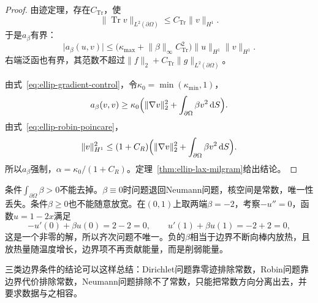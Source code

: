 \begin{proof}
由迹定理，存在$C_{\mathrm{Tr}}$，使
\[
 \lVert\operatorname{Tr}v\rVert_{L^2(\partial\Omega)}\leq C_{\mathrm{Tr}}\lVert v\rVert_{H^1} .
\]
于是$a_\beta$有界：
\[
 \lvert a_\beta(u,v)\rvert\leq\bigl(\kappa_{\max}+\lVert\beta\rVert_\infty C_{\mathrm{Tr}}^2\bigr)\lVert u\rVert_{H^1}\lVert v\rVert_{H^1} .
\]
右端泛函也有界，其范数不超过$\lVert f\rVert_2+C_{\mathrm{Tr}}\lVert g\rVert_{L^2(\partial\Omega)}$。

由式~\eqref{eq:ellip-gradient-control}，令$\kappa_0=\min(\kappa_{\min},1)$，
\[
 a_\beta(v,v)\geq\kappa_0\Bigl(\lVert\nabla v\rVert_2^2+\int_{\partial\Omega}\beta v^2\,\mathrm{d}S\Bigr) .
\]
由式~\eqref{eq:ellip-robin-poincare}，
\[
 \lVert v\rVert_{H^1}^2\leq(1+C_R)\Bigl(\lVert\nabla v\rVert_2^2+\int_{\partial\Omega}\beta v^2\,\mathrm{d}S\Bigr) .
\]
所以$a_\beta$强制，$\alpha=\kappa_0/(1+C_R)$。定理~\ref{thm:ellip-lax-milgram}给出结论。
\end{proof}

条件$\int_{\partial\Omega}\beta>0$不能去掉。$\beta\equiv0$时问题退回Neumann问题，核空间是常数，唯一性丢失。条件$\beta\geq0$也不能随意放宽。在$(0,1)$上取两端$\beta=-2$，考察$-u''=0$，函数$u=1-2x$满足
\[
 -u'(0)+\beta u(0)=2-2=0,\qquad u'(1)+\beta u(1)=-2+2=0 ,
\]
这是一个非零的解，所以齐次问题不唯一。负的$\beta$相当于边界不断向棒内放热，且放热量随温度增长，边界项不再贡献能量，而是削弱能量。

三类边界条件的结论可以这样总结：Dirichlet问题靠零迹排除常数，Robin问题靠边界代价排除常数，Neumann问题排除不了常数，只能把常数方向分离出去，并要求数据与之相容。
